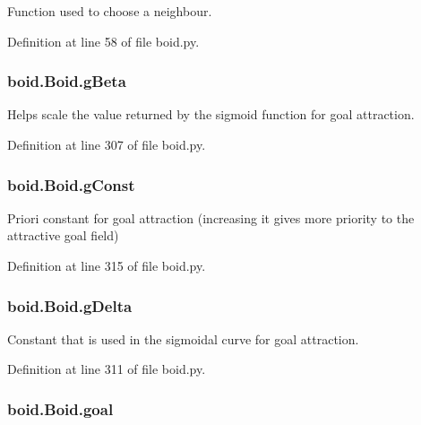 Function used to choose a neighbour. 



Definition at line 58 of file boid.\-py.

\hypertarget{classboid_1_1Boid_a2c33a265be5079b7b916be49933eccaf}{
\subsubsection[{g\-Beta}]{\setlength{\rightskip}{0pt plus 5cm}boid.\-Boid.\-g\-Beta}}\label{classboid_1_1Boid_a2c33a265be5079b7b916be49933eccaf}


Helps scale the value returned by the sigmoid function for goal attraction. 



Definition at line 307 of file boid.\-py.

\hypertarget{classboid_1_1Boid_a71d768a5bc70ecfcaec719cfd0c310ef}{
\subsubsection[{g\-Const}]{\setlength{\rightskip}{0pt plus 5cm}boid.\-Boid.\-g\-Const}}\label{classboid_1_1Boid_a71d768a5bc70ecfcaec719cfd0c310ef}


Priori constant for goal attraction (increasing it gives more priority to the attractive goal field) 



Definition at line 315 of file boid.\-py.

\hypertarget{classboid_1_1Boid_a17cd80cfac0fb27106c12e45929f9a9f}{
\subsubsection[{g\-Delta}]{\setlength{\rightskip}{0pt plus 5cm}boid.\-Boid.\-g\-Delta}}\label{classboid_1_1Boid_a17cd80cfac0fb27106c12e45929f9a9f}


Constant that is used in the sigmoidal curve for goal attraction. 



Definition at line 311 of file boid.\-py.

\hypertarget{classboid_1_1Boid_afe8350d9d4c1eeb15a5df7337328e1c7}{
\subsubsection[{goal}]{\setlength{\rightskip}{0pt plus 5cm}boid.\-Boid.\-goal}}\label{classboid_1_1Boid_afe8350d9d4c1eeb15a5df7337328e1c7}


